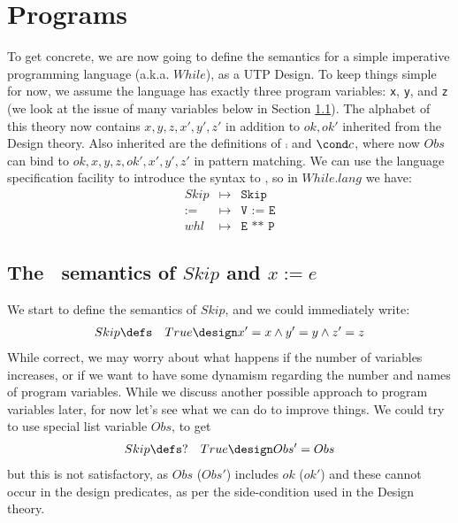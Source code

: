 \section{Programs}\label{sec:programs}


To get concrete, we are now going to define the semantics
for a simple imperative programming language (a.k.a. $While$),
as a UTP Design.
To keep things simple for now,
we assume the language has exactly three program variables:
 \texttt{x}, \texttt{y}, and \texttt{z}
(we look at the issue of many variables below in Section \ref{ssec:skip-n-assign}).
The alphabet of this theory now contains $x,y,z,x',y',z'$
in addition to $ok,ok'$ inherited from the Design theory.
Also inherited are the definitions of $\comp$ and $\cond c$,
where now $Obs$ can bind to $ok,x,y,z,ok',x',y',z'$
in pattern matching.
We can use the language specification facility to introduce the syntax
to , so in $While.lang$ we have:
\begin{eqnarray*}
   Skip & \mapsto & \texttt{Skip}
\\ :=  & \mapsto & \texttt{V := E}
\\ whl & \mapsto & \texttt{E ** P}
\end{eqnarray*}

\subsection{The \ semantics of $Skip$ and $x:=e$}
\label{ssec:skip-n-assign}

We start to define the semantics of $Skip$,
and we could immediately write:
\begin{eqnarray*}
  Skip &\defs& True \design x'=x \land y'=y \land z'=z
\end{eqnarray*}
While correct, we may worry about what happens if the number of variables
increases, or if we want to have some dynamism regarding the number and
names of program variables. While we discuss another possible approach
to program variables later, for now let's see what we can do to improve things.
We could try to use special list variable $Obs$,
to get
\begin{eqnarray*}
  Skip &\defs?& True \design Obs' = Obs
\end{eqnarray*}
but this is not satisfactory, as $Obs$ ($Obs'$) includes $ok$ ($ok'$)
and these cannot occur in the design predicates, as per the side-condition
used in the Design theory.

